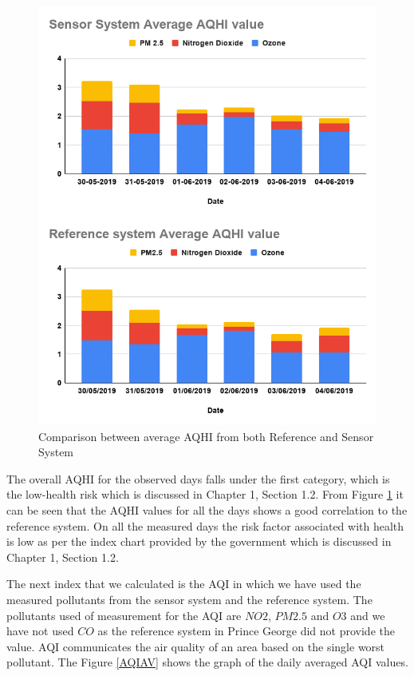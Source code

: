 \begin{figure}[h]
  \begin{center}
  \includegraphics[scale=0.53]{images/figure108.png}
  \end{center}
  \caption{Comparison between average AQHI from both Reference and Sensor System}
  \label{AQHIAV}
  \hspace{1 cm}
\end{figure}


The overall AQHI for the observed days falls under the first category, which is the low-health risk which is discussed in Chapter 1, Section 1.2. From Figure \ref{AQHIAV} it can be seen that the AQHI values for all the days shows a good correlation to the reference system. On all the measured days the risk factor associated with health is low as per the index chart provided by the government \cite{AQHICAN} which is discussed in Chapter 1, Section 1.2.

 The next index that we calculated is the AQI in which we have used the measured pollutants from the sensor system and the reference system. The pollutants used of measurement for the AQI are $NO2$, $PM2.5$ and $O3$ and we have not used $CO$ as the reference system in Prince George did not provide the value. AQI communicates the air quality of an area based on the single worst pollutant. The Figure \ref{AQIAV} shows the graph of the daily averaged AQI values.

